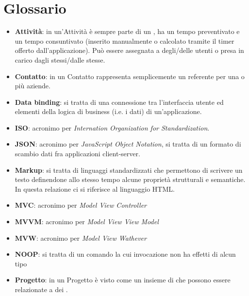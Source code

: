 \section{Glossario}

\begin{itemize}
\item \textbf{Attività}: in \fiscolo{} un'Attività è sempre parte di un ,
ha un tempo preventivato e un tempo consuntivato (inserito manualmente o calcolato tramite
il timer offerto dall'applicazione). Può essere assegnata a degli/delle utenti o presa
in carico dagli stessi/dalle stesse.

\item \textbf{Contatto}: in \fiscolo{} un Contatto rappresenta semplicemente un referente
per una o più aziende.

\item \textbf{Data binding}: si tratta di una connessione tra l'interfaccia utente ed
elementi della logica di business (i.e. i dati) di un'applicazione.

\item \textbf{ISO}: acronimo per \textit{Internation Organization for Standardization}.

\item \textbf{JSON}: acronimo per \textit{JavaScript Object Notation}, si tratta di un formato
di scambio dati fra applicazioni client-server.

\item \textbf{Markup}: si tratta di linguaggi standardizzati che permettono di scrivere un
testo definendone allo stesso tempo alcune proprietà strutturali e semantiche. In questa
relazione ci si riferisce al linguaggio HTML.

\item \textbf{MVC}: acronimo per \textit{Model View Controller}

\item \textbf{MVVM}: acronimo per \textit{Model View View Model}

\item \textbf{MVW}: acronimo per \textit{Model View Wathever}

\item \textbf{NOOP}: si tratta di un comando la cui invocazione non ha effetti di alcun
tipo

\item \textbf{Progetto}: in \fiscolo{} un Progetto è visto come un insieme di 
che possono essere relazionate a dei .


\end{itemize}
